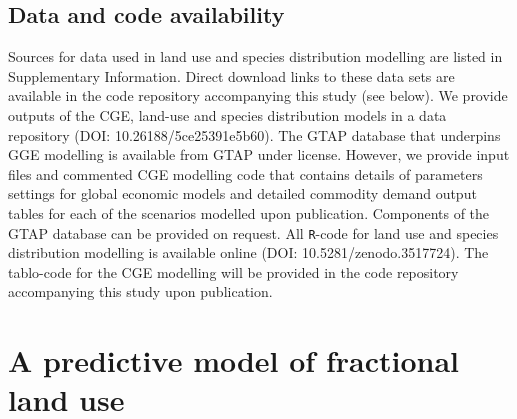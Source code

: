 \documentclass[titlesmallcaps,copyrightpage]{uomthesis}\usepackage[]{graphicx}\usepackage[]{color}
\begin{document}
\section{Data and code availability}
Sources for data used in land use and species distribution modelling are listed in Supplementary Information. Direct download links to these data sets are available in the code repository accompanying this study (see below). We provide outputs of the CGE, land-use and species distribution models in a data repository (DOI: 10.26188/5ce25391e5b60). The GTAP database that underpins GGE modelling is available from GTAP under license. However, we provide input files and commented CGE modelling code that contains details of parameters settings for global economic models and detailed commodity demand output tables for each of the scenarios modelled upon publication. Components of the GTAP database can be provided on request. All \texttt{R}-code for land use and species distribution modelling is available online (DOI: 10.5281/zenodo.3517724). The tablo-code for the CGE modelling will be provided in the code repository accompanying this study upon publication.

\chapter{A predictive model of fractional land use}
\label{ch3}
\newpage
\end{document}
